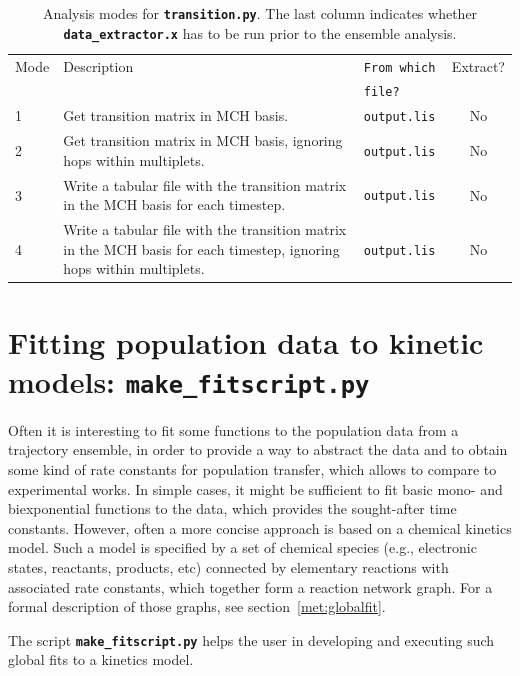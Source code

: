 \documentclass[a4paper,11pt,DIV=15,openany,twoside=false]{scrbook}
\newcommand{\ttt}[1]{\textbf{\texttt{#1}}}
\begin{document}
\begin{table}
  \centering
  \caption{Analysis modes for \ttt{transition.py}. The last column indicates whether \ttt{data\_extractor.x} has to be run prior to the ensemble analysis.}
  \label{tab:Transition_modes}
  \begin{tabular}{lp{6cm}>{\tt}lc}
    \toprule
    Mode        &Description    &\rmfamily From which     &Extract?\\
                               &&\rmfamily file?          &\\
    \midrule
    1   &Get transition matrix in MCH basis. &output.lis  &No\\
    2   &Get transition matrix in MCH basis, ignoring hops within multiplets. &output.lis  &No\\
    3   &Write a tabular file with the transition matrix in the MCH basis for each timestep. &output.lis  &No\\
    4   &Write a tabular file with the transition matrix in the MCH basis for each timestep, ignoring hops within multiplets.   &output.lis &No\\
    \bottomrule
  \end{tabular}
\end{table}




\section{Fitting population data to kinetic models: \ttt{make\_fitscript.py}}\label{sec:make_fitscript.py}

Often it is interesting to fit some functions to the population data from a trajectory ensemble, in order to provide a way to abstract the data and to obtain some kind of rate constants for population transfer, which allows to compare to experimental works.
In simple cases, it might be sufficient to fit basic mono- and biexponential functions to the data, which provides the sought-after time constants.
However, often a more concise approach is based on a chemical kinetics model.
Such a model is specified by a set of chemical species (e.g., electronic states, reactants, products, etc) connected by elementary reactions with associated rate constants, which together form a reaction network graph.
For a formal description of those graphs, see section~\ref{met:globalfit}.

The script \ttt{make\_fitscript.py} helps the user in developing and executing such global fits to a kinetics model.
\end{document}
